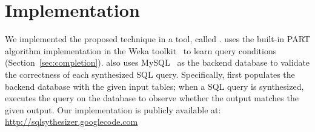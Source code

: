 
\section{Implementation}
\label{sec:implementation}

We implemented the proposed technique in a tool, called \ourtool. 
\ourtool uses the built-in PART algorithm implementation in
the Weka toolkit~\cite{Hall:2009} to learn query conditions
(Section~\ref{sec:completion}). \ourtool also uses
MySQL~\cite{mysql} as the backend
database to validate the correctness of each synthesized 
SQL query. Specifically, \ourtool first populates the backend database
with the given input tables; when a SQL query is
synthesized, \ourtool executes the query on the database
to observe whether the output matches the given output.
Our implementation is publicly available at:
\url{http://sqlsythesizer.googlecode.com}
